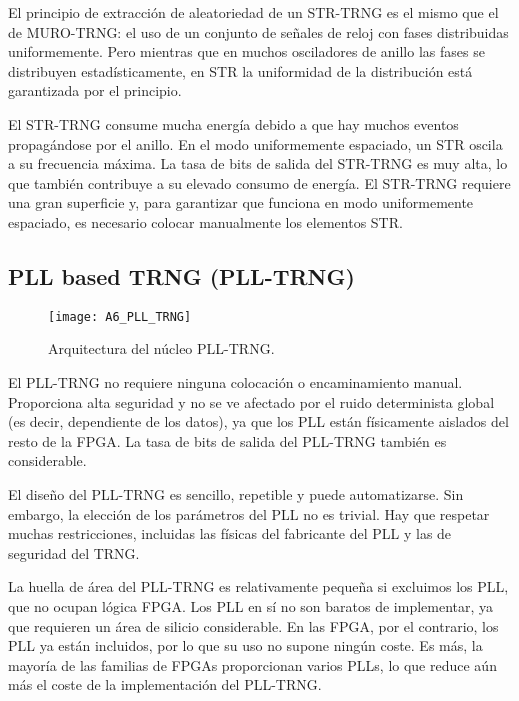                 El principio de extracción de aleatoriedad de un STR-TRNG es el mismo que el de MURO-TRNG: el uso de un conjunto de señales de reloj con fases distribuidas uniformemente. Pero mientras que en muchos osciladores de anillo las fases se distribuyen estadísticamente, en STR la uniformidad de la distribución está garantizada por el principio. 

                El STR-TRNG consume mucha energía debido a que hay muchos eventos propagándose por el anillo. En el modo uniformemente espaciado, un STR oscila a su frecuencia máxima. La tasa de bits de salida del STR-TRNG es muy alta, lo que también contribuye a su elevado consumo de energía. El STR-TRNG requiere una gran superficie y, para garantizar que funciona en modo uniformemente espaciado, es necesario colocar manualmente los elementos STR.
				
				
		\subsection{PLL based TRNG (PLL-TRNG)}
				
				\begin{figure}[hbtp]
					\caption{Arquitectura del núcleo PLL-TRNG.}
					\centering
					\texttt{[image: A6\_PLL\_TRNG]}
					\label{fig:A6_PLL_TRNG}
				\end{figure}

                El PLL-TRNG no requiere ninguna colocación o encaminamiento manual. Proporciona alta seguridad y no se ve afectado por el ruido determinista global (es decir, dependiente de los datos), ya que los PLL están físicamente aislados del resto de la FPGA. La tasa de bits de salida del PLL-TRNG también es considerable.

                El diseño del PLL-TRNG es sencillo, repetible y puede automatizarse. Sin embargo, la elección de los parámetros del PLL no es trivial. Hay que respetar muchas restricciones, incluidas las físicas del fabricante del PLL  y las de seguridad del TRNG. 

                La huella de área del PLL-TRNG es relativamente pequeña si excluimos los PLL, que no ocupan lógica FPGA. Los PLL en sí no son baratos de implementar, ya que requieren un área de silicio considerable. En las FPGA, por el contrario, los PLL ya están incluidos, por lo que su uso no supone ningún coste. Es más, la mayoría de las familias de FPGAs proporcionan varios PLLs, lo que reduce aún más el coste de la implementación del PLL-TRNG.

